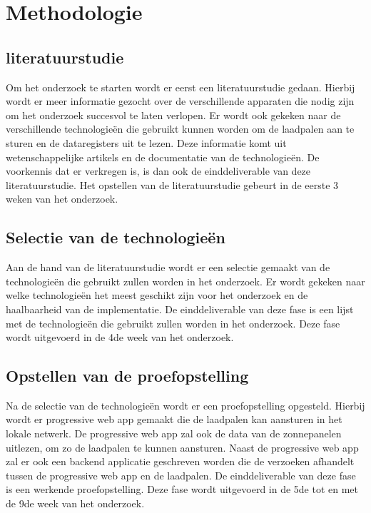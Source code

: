\section{Methodologie}%
\label{sec:methodologie}

\subsection{literatuurstudie}%
\label{sub:literatuurstudie_methodologie}
Om het onderzoek te starten wordt er eerst een literatuurstudie gedaan. Hierbij wordt er meer informatie gezocht over de verschillende apparaten die nodig zijn om het onderzoek succesvol te laten verlopen. Er wordt ook gekeken naar de verschillende technologieën die gebruikt kunnen worden om de laadpalen aan te sturen en de dataregisters uit te lezen. Deze informatie komt uit wetenschappelijke artikels en de documentatie van de technologieën. De voorkennis dat er verkregen is, is dan ook de einddeliverable van deze literatuurstudie. Het opstellen van de literatuurstudie gebeurt in de eerste 3 weken van het onderzoek.

\subsection{Selectie van de technologieën}%
\label{sub:selectie_van_de_technologieen}
Aan de hand van de literatuurstudie wordt er een selectie gemaakt van de technologieën die gebruikt zullen worden in het onderzoek. Er wordt gekeken naar welke technologieën het meest geschikt zijn voor het onderzoek en de haalbaarheid van de implementatie. De einddeliverable van deze fase is een lijst met de technologieën die gebruikt zullen worden in het onderzoek. Deze fase wordt uitgevoerd in de 4de week van het onderzoek.

\subsection{Opstellen van de proefopstelling}%
\label{sub:opstellen_van_de_proefopstelling}
Na de selectie van de technologieën wordt er een proefopstelling opgesteld. Hierbij wordt er progressive web app gemaakt die de laadpalen kan aansturen in het lokale netwerk. De progressive web app zal ook de data van de zonnepanelen uitlezen, om zo de laadpalen te kunnen aansturen. Naast de progressive web app zal er ook een backend applicatie geschreven worden die de verzoeken afhandelt tussen de progressive web app en de laadpalen. De einddeliverable van deze fase is een werkende proefopstelling. Deze fase wordt uitgevoerd in de 5de tot en met de 9de week van het onderzoek.

